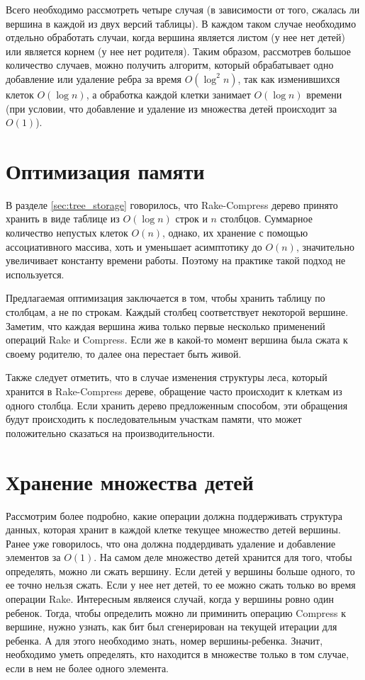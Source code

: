Всего необходимо рассмотреть четыре случая (в зависимости от того, сжалась ли вершина в каждой из двух версий таблицы). 
В каждом таком случае необходимо отдельно обработать случаи, когда вершина является листом (у нее нет детей) или является корнем (у нее нет родителя).
Таким образом, рассмотрев большое количество случаев, можно получить алгоритм, 
который обрабатывает одно добавление или удаление ребра за время $O(\log^2 n)$, 
так как изменившихся клеток $O(\log n)$, а обработка каждой клетки занимает $O(\log n)$ времени (при условии, что добавление и удаление из множества детей происходит за $O(1)$).
\FloatBarrier
\section{Оптимизация памяти}
\label{sec:memory}

В разделе \ref{sec:tree_storage} говорилось, что Rake-Compress дерево принято хранить в виде таблице из $O(\log n)$ строк и $n$ столбцов. 
Суммарное количество непустых клеток $O(n)$, однако, их хранение с помощью ассоциативного массива, хоть и уменьшает асимптотику до $O(n)$, значительно увеличивает константу времени работы.
Поэтому на практике такой подход не используется. 

Предлагаемая оптимизация заключается в том, чтобы хранить таблицу по столбцам, а не по строкам. Каждый столбец соответствует некоторой вершине.
Заметим, что каждая вершина жива только первые несколько применений операций Rake и Compress. Если же в какой-то момент вершина была сжата к своему родителю, то далее она перестает быть живой.

Также следует отметить, что в случае изменения структуры леса, который хранится в Rake-Compress дереве, обращение часто происходит к клеткам из одного столбца. 
Если хранить дерево предложенным способом, эти обращения будут происходить к последовательным участкам памяти, что может положительно сказаться на производительности.

\FloatBarrier
\section{Хранение множества детей}
\label{sec:set_storage}

Рассмотрим более подробно, какие операции должна поддерживать структура данных, которая хранит в каждой клетке текущее множество детей вершины.
Ранее уже говорилось, что она должна поддердивать удаление и добавление элементов за $O(1)$. 
На самом деле множество детей хранится для того, чтобы определять, можно ли сжать вершину. Если детей у вершины больше одного, то ее точно нельзя сжать.
Если у нее нет детей, то ее можно сжать только во время операции Rake. Интересным являеися случай, когда у вершины ровно один ребенок. Тогда, чтобы определить 
можно ли приминить операцию Compress к вершине, нужно узнать, как бит был сгенерирован на текущей итерации для ребенка. А для этого необходимо знать, номер вершины-ребенка.
Значит, необходимо уметь определять, кто находится в множестве только в том случае, если в нем не более одного элемента.

